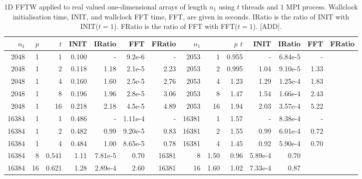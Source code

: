 \documentclass[a4]{article}
\begin{document}
\begin{table}
\begin{center}
\begin{tabular}{|r|r|r|r|r|r|r||r|r|r|r|r|r|r|}
\hline $n_1$ & $p$ & $t$ & INIT & IRatio & FFT & FRatio & $n_1$ & & $p$ $t$ & INIT & IRatio & FFT & FRatio  \\ \hline
2048 & 1 & 1 & 0.100 & -     & 9.2e-6 & - & 2053 & 1  & 0.955 & -   & 6.84e-5 & -   \\
2048& 1 & 2 & 0.118 & 1.18  & 2.1e-5 & 2.23 & 2053 & 2  & 0.995 & 1.04 & 9.10e-5 & 1.33  \\
2048& 1 & 4 & 0.160 & 1.60  & 2.5e-5 & 2.76 & 2053 & 4  & 1.23 & 1.29 & 1.25e-4 & 1.83   \\
2048& 1 & 8 & 0.196 & 1.96  & 2.8e-5 & 3.06 & 2053 & 8  & 1.47 & 1.54 &  1.66e-4 & 2.43  \\
2048& 1 & 16 & 0.218 & 2.18 & 4.5e-5 & 4.89 & 2053 & 16 & 1.94 & 2.03 &  3.57e-4 & 5.22   \\ \hline
16384& 1 & 1 &  0.486 & - &    1.11e-4 & -  & 16381 & 1 & 1.57 & -    & 8.38e-4 & -   \\
16384& 1 & 2 &  0.482 & 0.99 & 9.20e-5 & 0.83 & 16381 & 2 & 1.55 & 0.99 & 6.01e-4 & 0.72    \\
16384& 1 & 4 &  0.484 & 1.00 & 8.65e-5 & 0.78  & 16381 & 4 & 1.45 & 0.92 & 5.90e-4 & 0.70    \\
16384 & 8 &  0.541 & 1.11 & 7.81e-5 & 0.70  & 16381 & 8 & 1.50 & 0.96 & 5.89e-4 & 0.70    \\
16384 & 16 & 0.621 & 1.28 & 2.89e-4 & 2.60  & 16381 & 16 & 1.60 & 1.02 & 7.33e-4 & 0.87   \\ \hline
\end{tabular}
\caption{1D FFTW applied to real valued one-dimensional arrays of length $n_1$ using $t$ threads and $1$ MPI process. Wallclock initialisation time, INIT, and wallclock FFT time, FFT, are given in seconds. IRatio is the ratio of INIT with INIT($t=1$). FRatio is the ratio of FFT with FFT($t=1$).  [ADD].}\label{Tbl:FFT1dthreads}
\end{center}
\end{table}





\end{document}
